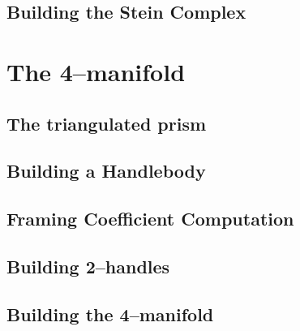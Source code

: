 	\subsection{Building the Stein Complex}
	\label{sub:steinbuild}
	

\section{The 4--manifold}
\label{sec:4man}


	\subsection{The triangulated prism}
	\label{sub:nprism}
	
	
	\subsection{Building a Handlebody}
	\label{sub:handlebody}
	

	\subsection{Framing Coefficient Computation}
	\label{sub:gleams}
	
	
	\subsection{Building 2--handles}
	\label{sub:2handles}
	
	
	\subsection{Building the 4--manifold}
	\label{sub:final}
	

